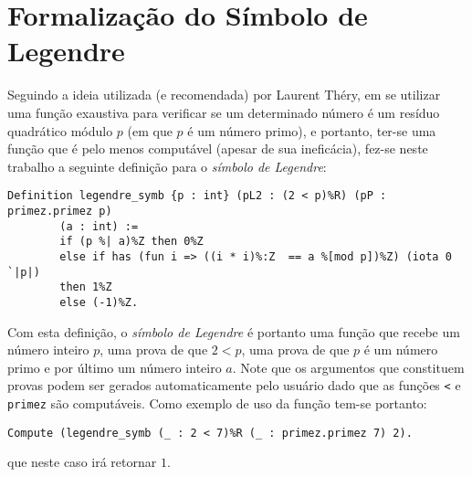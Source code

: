 
\section{Formalização do Símbolo de Legendre}

Seguindo a ideia utilizada (e recomendada) por Laurent Théry, em se utilizar uma função exaustiva para verificar se um determinado número é um resíduo quadrático módulo $p$ (em que $p$ é um número primo), e portanto, ter-se uma função que é pelo menos computável (apesar de sua ineficácia), fez-se neste trabalho a seguinte definição para o \textit{símbolo de Legendre}:
\begin{lstlisting}[language=coq]
        Definition legendre_symb {p : int} (pL2 : (2 < p)%R) (pP : primez.primez p) 
        (a : int) :=
        if (p %| a)%Z then 0%Z
        else if has (fun i => ((i * i)%:Z  == a %[mod p])%Z) (iota 0 `|p|)
        then 1%Z
        else (-1)%Z.
\end{lstlisting}
Com esta definição, o \textit{símbolo de Legendre} é portanto uma função que recebe um número inteiro $p$, uma prova de que $2 < p$, uma prova de que $p$ é um número primo e por último um número inteiro $a$. Note que os argumentos que constituem provas podem ser gerados automaticamente pelo usuário dado que as funções \lstinline[language=coq]!<! e \lstinline[language=coq]!primez! são computáveis. Como exemplo de uso da função tem-se portanto:
\begin{lstlisting}[language=coq]
        Compute (legendre_symb (_ : 2 < 7)%R (_ : primez.primez 7) 2).
\end{lstlisting}
que neste caso irá retornar $1$.

